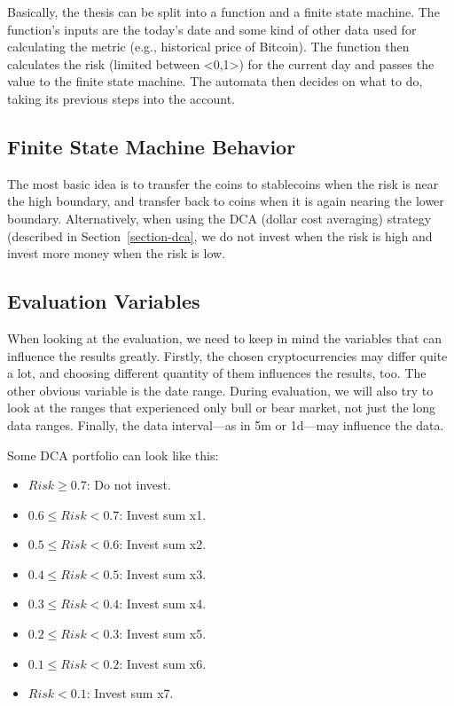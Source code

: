 Basically, the thesis can be split into a function and a finite state machine. The function's inputs are the today's date and some kind of other data used for calculating the metric (e.g., historical price of Bitcoin). The function then calculates the risk (limited between <0,1>) for the current day and passes the value to the finite state machine. The automata then decides on what to do, taking its previous steps into the account.

\subsection*{Finite State Machine Behavior}
The most basic idea is to transfer the coins to stablecoins when the risk is near the high boundary, and transfer back to coins when it is again nearing the lower boundary. Alternatively, when using the DCA (dollar cost averaging) strategy (described in Section~\ref{section-dca}, we do not invest when the risk is high and invest more money when the risk is low.

\subsection*{Evaluation Variables}
When looking at the evaluation, we need to keep in mind the variables that can influence the results greatly. Firstly, the chosen cryptocurrencies may differ quite a lot, and choosing different quantity of them influences the results, too. The other obvious variable is the date range. During evaluation, we will also try to look at the ranges that experienced only bull or bear market, not just the long data ranges. Finally, the data interval---as in 5m or 1d---may influence the data.

Some DCA portfolio can look like this:
\begin{itemize}
    \item $Risk \ge  0.7$: Do not invest.
    \item $0.6 \le Risk < 0.7$: Invest sum x1.
    \item $0.5 \le Risk < 0.6$: Invest sum x2.
    \item $0.4 \le Risk < 0.5$: Invest sum x3.
    \item $0.3 \le Risk < 0.4$: Invest sum x4.
    \item $0.2 \le Risk < 0.3$: Invest sum x5.
    \item $0.1 \le Risk < 0.2$: Invest sum x6.
    \item $Risk < 0.1$: Invest sum x7.
\end{itemize}

